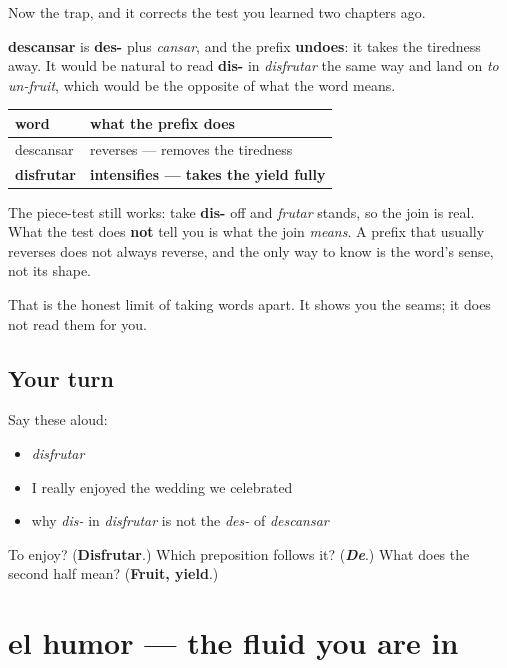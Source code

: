 \begin{culture}
Now the trap, and it corrects the test you learned two chapters ago.

\textbf{descansar} is \textbf{des-} plus \emph{cansar}, and the prefix \textbf{undoes}: it takes the tiredness away. It would be natural to read \textbf{dis-} in \emph{disfrutar} the same way and land on \emph{to un-fruit}, which would be the opposite of what the word means.

\noindent
\begin{tabularx}{\linewidth}{@{}>{\raggedright\arraybackslash}X>{\raggedright\arraybackslash}X@{}}
\toprule
\textbf{word} & \textbf{what the prefix does} \\
\midrule
descansar & reverses — removes the tiredness \\
\textbf{disfrutar} & \textbf{intensifies — takes the yield fully} \\
\bottomrule
\end{tabularx}

The piece-test still works: take \textbf{dis-} off and \emph{frutar} stands, so the join is real. What the test does \textbf{not} tell you is what the join \emph{means}. A prefix that usually reverses does not always reverse, and the only way to know is the word's sense, not its shape.

That is the honest limit of taking words apart. It shows you the seams; it does not read them for you.
\end{culture}

\subsection*{Your turn}
Say these aloud:

\begin{itemize}
\raggedright
  \item \emph{disfrutar}
  \item I really enjoyed the wedding we celebrated
  \item why \emph{dis-} in \emph{disfrutar} is not the \emph{des-} of \emph{descansar}
\end{itemize}

\begin{tcolorbox}[breakable,colback=teal!4,colframe=teal!35!black,title={Before you move on}]
To enjoy? (\textbf{Disfrutar}.) Which preposition follows it? (\emph{\textbf{De}}.) What does the second half mean? (\textbf{Fruit, yield}.)
\end{tcolorbox}
\section[el humor]{el humor — the fluid you are in}

